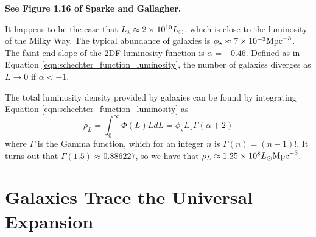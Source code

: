 \documentclass[]{article}
\begin{document}
{\bf See Figure 1.16 of Sparke and Gallagher.}

It happens to be the case that $L_{\star}\approx2\times10^{10}L_{\odot}$, which is close
to the luminosity of the Milky Way. The typical abundance of galaxies is $\phi_\star\approx7\times10^{-3}\mathrm{Mpc}^{-3}$. The faint-end slope of the 2DF luminosity function is $\alpha=-0.46$.
Defined as in Equation \ref{eqn:schechter_function_luminosity}, the number of galaxies
diverges as $L\to0$ if $\alpha<-1$.

The total luminosity density provided by galaxies can be found by integrating 
Equation \ref{eqn:schechter_function_luminosity} as
\begin{equation}
\rho_{L} = \int_{0}^{\infty} \Phi(L) L dL = \phi_\star L_{\star} \Gamma(\alpha + 2)
\end{equation}
\noindent
where $\Gamma$ is the Gamma function, which for an integer $n$ is $\Gamma(n) = (n-1)!$.
It turns out that $\Gamma(1.5)\approx0.886227$, so we have that 
$\rho_{L}\approx1.25\times10^{8}L_{\odot}\mathrm{Mpc}^{-3}$.

\section{Galaxies Trace the Universal Expansion}
\end{document}
